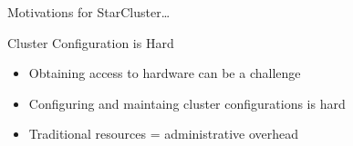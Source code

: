 \begin{nologo}
\begin{frame}{Motivations for StarCluster\dots}
\begin{block}{Cluster Configuration is Hard}
\centering
{}
\begin{itemize}
    \item Obtaining access to hardware can be a challenge
    \item Configuring and maintaing cluster configurations is hard
    \item Traditional resources = administrative overhead
\end{itemize}
\end{block}
\end{frame}
\end{nologo}

